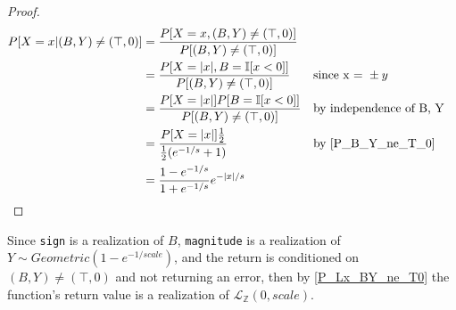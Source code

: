\documentclass{article}
\begin{document}
\begin{proof}
\begin{align*}
P[X = x | (B, Y) \neq (\top, 0)] &= \frac{P[X = x, (B, Y) \neq (\top, 0)]}{P[(B, Y) \neq (\top, 0)]} \\
    &= \frac{P[X = |x|, B = \mathbb{I}[x < 0]]}{P[(B, Y) \neq (\top, 0)]} && \text{since x = }\pm y \\
    &= \frac{P[X = |x|] P[B = \mathbb{I}[x < 0]]}{P[(B, Y) \neq (\top, 0)]} && \text{by independence of B, Y} \\
    &= \frac{P[X = |x|] \frac{1}{2}}{\frac{1}{2} (e^{-1/s} + 1)} && \text{by } \ref{P_B_Y_ne_T_0} \\
    &= \frac{1 - e^{-1/s}}{1 + e^{-1/s}} e^{-|x|/s} \\
\end{align*}
\end{proof}

Since \texttt{sign} is a realization of $B$, \texttt{magnitude} is a realization of $Y \sim Geometric(1 - e^{-1/scale})$, and the return is conditioned on $(B, Y) \neq (\top, 0)$ and not returning an error, then by \ref{P_Lx_BY_ne_T0} the function's return value is a realization of $\mathcal{L}_\mathbb{Z}(0, scale)$.




\end{document}
